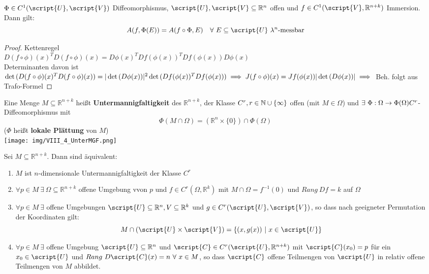   \begin{theorem}
    $\Phi \in C^1(\script{U}, \script{V})$ Diffeomorphismus, $\script{U}, \script{V} \subseteq \mathbb{R}^n$ offen und $f \in C^1(\script{V}, \mathbb{R}^{n+k})$ Immersion. Dann gilt:
    $$A(f, \Phi(E)) = A(f\circ\Phi, E) \ \ \ \forall \ E \subseteq \script{U} \ \lambda^n\text{-messbar}$$
  \end{theorem}
  \begin{proof}
    Kettenregel \\
    $D(f\circ \phi)(x)^T D(f\circ\phi)(x) = D\phi(x)^T Df(\phi(x))^T Df(\phi(x)) D\phi(x)$ \\
    Determinanten davon ist \\
    $\det{(D(f\circ\phi)(x)^T D(f\circ\phi)(x))} = |\det{(D\phi(x))}|^2 \det{(Df(\phi(x))^T Df(\phi(x)))} \\
    \implies J(f\circ\phi)(x) = J f(\phi(x)) |\det{(D\phi(x))}|\\
    \implies $ Beh. folgt aus Trafo-Formel
  \end{proof}

  \begin{definition}[Untermannigfaltigkeiten]
    Eine Menge $M \subseteq \mathbb{R}^{n+k}$ heißt \textbf{Untermannigfaltigkeit} des $\mathbb{R}^{n+k}$, der Klasse $C^r,\\ r\in \mathbb{N}\cup\{\infty\}$ offen (mit $M \in \Omega$) und $\exists \ \Phi: \Omega \to \Phi(\Omega) \\
    C^r$-Diffeomorphismus mit
    $$\Phi(M \cap \Omega) = (\mathbb{R}^n \times \{0\}) \cap \Phi(\Omega)$$
    ($\Phi$ heißt \textbf{lokale Plättung} von $M$)\\
    \texttt{[image: img/VIII\_4\_UnterMGF.png]}
  \end{definition}

  \begin{theorem}
    Sei $M \subseteq \mathbb{R}^{n+k}$. Dann sind äquivalent:
    \begin{enumerate}
      \item $M$ ist $n$-dimensionale Untermannigfaltigkeit der Klasse $C^r$
      \item $\forall p \in M \ \exists \ \Omega\subseteq\mathbb{R}^{n+k}$ offene Umgebung vvon $p$ und $f \in C^r(\Omega, \mathbb{R}^k)$ mit $M \cap \Omega = f^{-1}(0)$ und $Rang \ Df = k$ auf $\Omega$
      \item $\forall p \in M \ \exists$ offene Umgebungen $\script{U}\subseteq \mathbb{R}^n, V\subseteq \mathbb{R}^k$ und $g \in C^r(\script{U}, \script{V})$, so dass nach geeigneter Permutation der Koordinaten gilt:\\
      $$M \cap (\script{U} \times \script{V}) = \{(x, g(x)) \ | \ x \in \script{U}\}$$
      \item $\forall p \in M \ \exists$ offene Umgebung $\script{U}\subseteq \mathbb{R}^n$ und $\script{C} \in C^r(\script{U}, \mathbb{R}^{n+k})$ mit $\script{C}(x_0) = p$ für ein $x_0 \in \script{U}$ und $Rang \ D\script{C}(x) = n \ \forall \ x\in M$, so dass $\script{C}$ offene Teilmengen von $\script{U}$ in relativ offene Teilmengen von $M$ abbildet. 
    \end{enumerate}
  \end{theorem}

